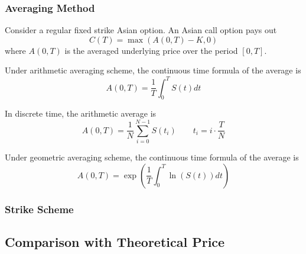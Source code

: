 \documentclass[a4paper,11pt] {article}
\begin{document}
\subsubsection{Averaging Method}
Consider a regular fixed strike Asian option. An Asian call option pays out 
$$
C(T) = \max(A(0,T)-K,0)
$$
where $A(0,T)$ is the averaged underlying price over the period $[0,T]$. 

Under arithmetic averaging scheme, the continuous time formula of the average is 
$$
A(0,T) = \frac{1}{T} \int_0^T S(t)dt
$$

In discrete time, the arithmetic average is
$$
A(0,T) = \frac{1}{N} \sum_{i=0}^{N-1} S(t_i) \qquad t_i = i \cdot \frac{T}{N}
$$

Under geometric averaging scheme, the continuous time formula of the average is
$$
A(0,T) = \exp\left(\frac{1}{T} \int_0^T \ln(S(t))dt\right)
$$



\subsubsection{Strike Scheme}

\subsection{Comparison with Theoretical Price}


%
\end{document}
